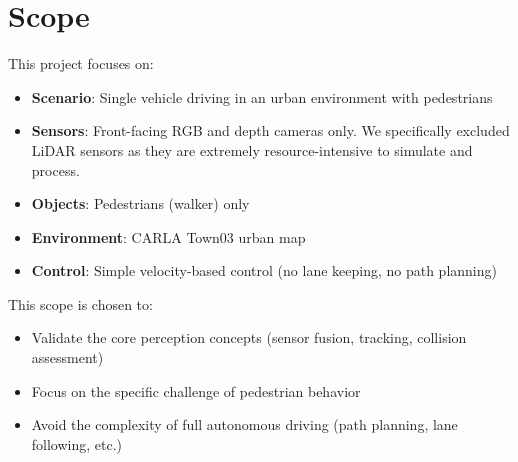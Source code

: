 \section{Scope}

This project focuses on:
\begin{itemize}
    \item \textbf{Scenario}: Single vehicle driving in an urban environment with pedestrians
    \item \textbf{Sensors}: Front-facing RGB and depth cameras only. We specifically excluded LiDAR sensors as they are extremely resource-intensive to simulate and process.
    \item \textbf{Objects}: Pedestrians (walker) only
    \item \textbf{Environment}: CARLA Town03 urban map
    \item \textbf{Control}: Simple velocity-based control (no lane keeping, no path planning)
\end{itemize}

This scope is chosen to:
\begin{itemize}
    \item Validate the core perception concepts (sensor fusion, tracking, collision assessment)
    \item Focus on the specific challenge of pedestrian behavior
    \item Avoid the complexity of full autonomous driving (path planning, lane following, etc.)
\end{itemize}